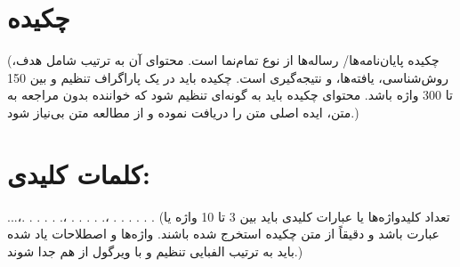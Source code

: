 \section*{چکیده}
(چکیده پایان‌نامه‌ها/ رساله‌ها از نوع تمام‌نما است. محتوای آن به ترتیب شامل هدف، روش‌شناسی، یافته‌ها، و نتیجه‌گیری است. چکیده باید در یک پاراگراف تنظیم و بین 150 تا 300 واژه باشد. محتوای چکیده  باید به گونه‌ای تنظیم شود که خواننده بدون مراجعه به متن، ایده اصلی متن را دریافت نموده و از مطالعه متن بی‌نیاز شود.)


\vfil

\section*{کلمات کلیدی:}
...،. . . . . .، . . . . .، . . . . . .
(تعداد کلید‌واژه‌ها یا عبارات کلیدی باید بین 3 تا 10 واژه یا عبارت باشد و دقیقاً از متن چکیده  استخرج شده باشند. وا‌ژه‌ها و اصطلاحات یاد شده باید به ترتیب الفبایی تنظیم  و با ویرگول از هم جدا شوند.)
